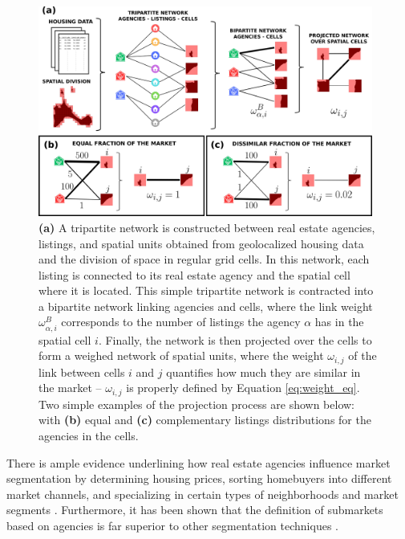 \begin{figure}
    
    \centering
    \includegraphics[width =0.98\textwidth]{Figs/Idealista_segmentation/NETWORK.pdf}
	\caption[Bipartite network construction and projection.]{ \textbf{(a)} A tripartite network is constructed between real estate agencies, listings, and spatial units obtained from geolocalized housing data and the division of space in regular grid cells. In this network, each listing is connected to its real estate agency and the spatial cell where it is located. This simple tripartite network is contracted into a bipartite network linking agencies and cells, where the link weight $\omega^{B}_{\alpha,i}$ corresponds to the number of listings the agency $\alpha$ has in the spatial cell $i$. Finally, the network is then projected over the cells to form a weighed network of spatial units, where the weight $\omega_{i,j}$ of the link between cells $i$ and $j$ quantifies how much they are similar in the market -- $\omega_{i,j}$ is properly defined by Equation \eqref{eq:weight_eq}. Two simple examples of the projection process are shown below: with \textbf{(b)} equal and \textbf{(c)} complementary listings distributions for the agencies in the cells. \label{fig:network_construction}}
\end{figure}


There is ample evidence underlining how real estate agencies influence market segmentation by determining housing prices, sorting homebuyers into different market channels, and specializing in certain types of neighborhoods and market segments \cite{palm1976RealEstate,palm1978spatial,keskin2017defining,bonneval2017agents,besbris2017investigating}. Furthermore, it has been shown that the definition of submarkets based on agencies is far superior to other segmentation techniques \cite{leishman2013PredictivePerformance}. 


